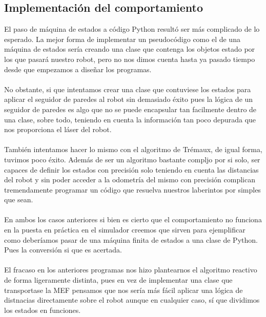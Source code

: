 \documentclass[a4paper,9pt]{article}
\begin{document}
\subsection{Implementación del comportamiento}
El paso de máquina de estados a código Python resultó ser más complicado de lo esperado. La mejor forma de implementar un pseudocódigo como el de una máquina de estados sería 
creando una clase que contenga los objetos estado por los que pasará nuestro robot, pero no nos dimos cuenta hasta ya pasado tiempo desde que empezamos a diseñar los programas. 
\paragraph{}
No obstante, si que intentamos crear una clase que contuviese los estados para aplicar el seguidor de paredes al robot sin demasiado éxito pues la lógica de un seguidor de paredes
es algo que no se puede encapsular tan facilmente dentro de una clase, sobre todo, teniendo en cuenta la información tan poco depurada que nos proporciona el láser del robot.
\paragraph{}
También intentamos hacer lo mismo con el algoritmo de Trémaux, de igual forma, tuvimos poco éxito. Además de ser un algoritmo
bastante compljo por si solo, ser capaces de definir los estados con precisión solo teniendo en cuenta las distancias 
del robot y sin poder acceder a la odometría del mismo con precisión complican tremendamente programar un código que 
resuelva nuestros laberintos por simples que sean.
\paragraph{}
En ambos los casos anteriores si bien es cierto que el comportamiento no funciona en la puesta en práctica en el simulador 
creemos que sirven para ejemplificar como deberíamos pasar de una máquina finita de estados a una clase de Python. Pues 
la conversión si que es acertada.
\paragraph{}
El fracaso en los anteriores programas nos hizo plantearnos el algoritmo reactivo de forma ligeramente distinta, pues en 
vez de implementar una clase que transportase la MEF pensamos que nos sería más fácil aplicar una lógica de distnacias 
directamente sobre el robot aunque en cualquier caso, sí que dividimos los estados en funciones.
\end{document}
